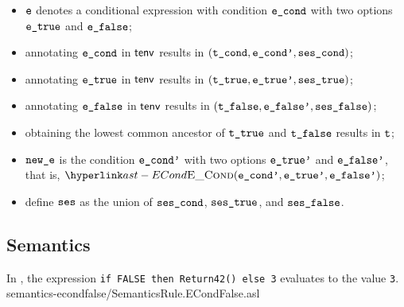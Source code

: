 \ProseParagraph
\AllApply
\begin{itemize}
  \item $\ve$ denotes a conditional expression with condition $\econd$ with two options $\etrue$ and $\efalse$;
  \item annotating $\econd$ in $\tenv$ results in $(\tcond, \econdp, \vsescond)$\ProseOrTypeError;
  \item annotating $\etrue$ in $\tenv$ results in $(\ttrue, \etruep, \vsestrue)$\ProseOrTypeError;
  \item annotating $\efalse$ in $\tenv$ results in $(\tfalse, \efalsep, \vsesfalse)$;
  \item obtaining the lowest common ancestor of $\ttrue$ and $\tfalse$ results in $\vt$\ProseOrTypeError;
  \item $\newe$ is the condition $\econdp$ with two options $\etruep$ and $\efalsep$, that is, $\ECond(\econdp, \etruep, \efalsep)$;
  \item define $\vses$ as the union of $\vsescond$, $\vsestrue$, and $\vsesfalse$.
\end{itemize}
\FormallyParagraph
\begin{mathpar}
\end{mathpar}

\subsection{Semantics}
In ,
the expression \texttt{if FALSE then Return42() else 3} evaluates to the value \texttt{3}.
{semantics-econdfalse}{\semanticstests/SemanticsRule.ECondFalse.asl}

